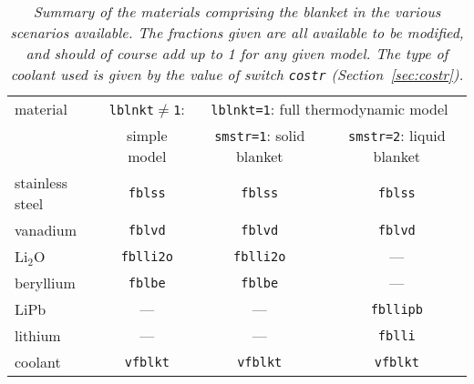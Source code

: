 
\begin{table}
\begin{center}

\begin{tabular}{||l||c||c||c||} \hline
material & {\tt lblnkt$\not=$1}: & \multicolumn{2}{c||}{{\tt lblnkt=1}: full
thermodynamic model} \\ \cline{3-4}
 & simple model & {\tt smstr=1}: solid blanket & {\tt smstr=2}: liquid blanket
\\ \hline
stainless steel & {\tt fblss}   & {\tt fblss}   & {\tt fblss}   \\
vanadium        & {\tt fblvd}   & {\tt fblvd}   & {\tt fblvd}   \\
Li$_2$O         & {\tt fblli2o} & {\tt fblli2o} &     ---       \\
beryllium       & {\tt fblbe}   & {\tt fblbe}   &     ---       \\
LiPb            &     ---       &     ---       & {\tt fbllipb} \\
lithium         &     ---       &     ---       & {\tt fblli}   \\
coolant         & {\tt vfblkt}  & {\tt vfblkt}  & {\tt vfblkt}  \\ \hline
\end{tabular}
\end{center}
\caption[TABLE_BKT]{{\it
Summary of the materials comprising the blanket in the various scenarios
available. The fractions given are all available to be modified, and should
of course add up to 1 for any given model. The type of coolant used is given
by the value of switch {\tt costr} (Section~\ref{sec:costr}).
}}
\label{tab:blanket}
\end{table}
